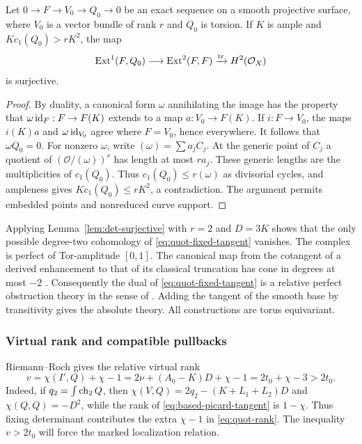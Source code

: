 \begin{lemma}
\label{lem:det-surjective}
Let \(0\to F\to V_0\to Q_0\to0\) be an exact sequence on a smooth
projective surface, where \(V_0\) is a vector bundle of rank \(r\)
and \(Q_0\) is torsion.
If \(K\) is ample and \(Kc_1(Q_0)>rK^2\), the map
\[
 \operatorname{Ext}^1(F,Q_0)\longrightarrow\operatorname{Ext}^2(F,F)
 \xrightarrow{\mathrm{tr}}H^2(\mathcal O_X)
\]
is surjective.
\end{lemma}

\begin{proof}
By duality, a canonical form \(\omega\) annihilating the image has the
property that \(\omega\operatorname{id}_F:F\to F(K)\) extends to a map
\(a:V_0\to F(K)\).
If \(i:F\to V_0\), the maps \(i(K)a\) and
\(\omega\operatorname{id}_{V_0}\) agree where \(F=V_0\), hence everywhere.
It follows that \(\omega Q_0=0\).
For nonzero \(\omega\), write \((\omega)=\sum a_jC_j\).
At the generic point of \(C_j\) a quotient of
\((\mathcal O/(\omega))^r\) has length at most \(ra_j\).
These generic lengths are the multiplicities of \(c_1(Q_0)\).
Thus \(c_1(Q_0)\leq r(\omega)\) as divisorial cycles, and ampleness
gives \(Kc_1(Q_0)\leq rK^2\), a contradiction.
The argument permits embedded points and nonreduced curve support.
\end{proof}

Applying Lemma~\ref{lem:det-surjective} with \(r=2\) and \(D=3K\)
shows that the only possible degree-two cohomology of
\eqref{eq:quot-fixed-tangent} vanishes. The complex is perfect of
Tor-amplitude \([0,1]\).
The canonical map from the cotangent of a derived enhancement to that
of its classical truncation has cone in degrees at most \(-2\)
\cite[Proposition 1.2 and Corollary 1.4]{STV}.
Consequently the dual of \eqref{eq:quot-fixed-tangent} is a relative
perfect obstruction theory in the sense of \cite[Definitions 4.4 and
5.1]{BF}. Adding the tangent of the smooth base by transitivity gives
the absolute theory. All constructions are torus equivariant.

\subsubsection{Virtual rank and compatible pullbacks}

Riemann--Roch gives the relative virtual rank
\begin{equation}
\label{eq:quot-rank}
 v=\chi(I',Q)+\chi-1
   =2\nu+(A_0-K)D+\chi-1
   =2t_0+\chi-3>2t_0.
\end{equation}
Indeed, if \(q_2=\int\operatorname{ch}_2Q\), then
\(\chi(V,Q)=2q_2-(K+L_1+L_2)D\) and
\(\chi(Q,Q)=-D^2\), while the rank of
\eqref{eq:based-picard-tangent} is \(1-\chi\).
Thus fixing determinant contributes the extra \(\chi-1\) in
\eqref{eq:quot-rank}.  The inequality \(v>2t_0\) will force the
marked localization relation.

